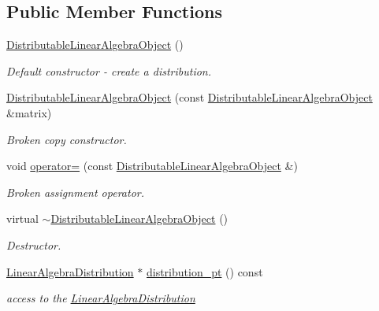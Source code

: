 \subsection*{Public Member Functions}
\begin{DoxyCompactItemize}
\item 
\hyperlink{classoomph_1_1DistributableLinearAlgebraObject_ac9492d59cff9d9b0098712ae72989cd3}{Distributable\+Linear\+Algebra\+Object} ()
\begin{DoxyCompactList}\small\item\em Default constructor -\/ create a distribution. \end{DoxyCompactList}\item 
\hyperlink{classoomph_1_1DistributableLinearAlgebraObject_a21e24b4ce887a2e2da4dc60808f53f91}{Distributable\+Linear\+Algebra\+Object} (const \hyperlink{classoomph_1_1DistributableLinearAlgebraObject}{Distributable\+Linear\+Algebra\+Object} \&matrix)
\begin{DoxyCompactList}\small\item\em Broken copy constructor. \end{DoxyCompactList}\item 
void \hyperlink{classoomph_1_1DistributableLinearAlgebraObject_a0d60098e4938b78dd3e2724551a4c7c9}{operator=} (const \hyperlink{classoomph_1_1DistributableLinearAlgebraObject}{Distributable\+Linear\+Algebra\+Object} \&)
\begin{DoxyCompactList}\small\item\em Broken assignment operator. \end{DoxyCompactList}\item 
virtual \hyperlink{classoomph_1_1DistributableLinearAlgebraObject_a4038de53b5737dc625411e7848d21dad}{$\sim$\+Distributable\+Linear\+Algebra\+Object} ()
\begin{DoxyCompactList}\small\item\em Destructor. \end{DoxyCompactList}\item 
\hyperlink{classoomph_1_1LinearAlgebraDistribution}{Linear\+Algebra\+Distribution} $\ast$ \hyperlink{classoomph_1_1DistributableLinearAlgebraObject_a603105384d60c9a3710378af39f538b9}{distribution\+\_\+pt} () const
\begin{DoxyCompactList}\small\item\em access to the \hyperlink{classoomph_1_1LinearAlgebraDistribution}{Linear\+Algebra\+Distribution} \end{DoxyCompactList}\item 

\end{DoxyCompactItemize}
